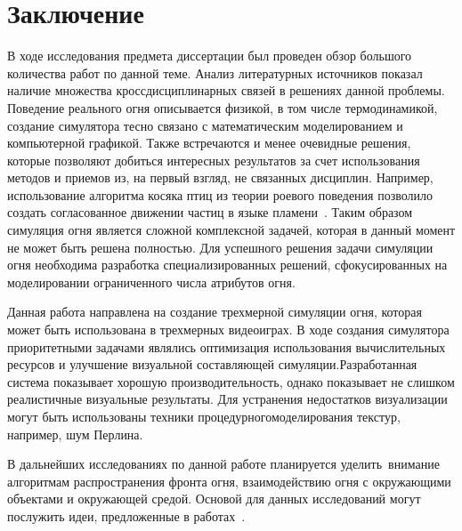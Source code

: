 \part*{Заключение}

В ходе исследования предмета диссертации был проведен обзор большого количества
работ по данной теме. Анализ литературных источников показал наличие множества
кроссдисциплинарных связей в решениях данной проблемы. Поведение реального огня
описывается физикой, в том числе термодинамикой, создание симулятора тесно
связано с математическим моделированием и компьютерной графикой. Также
встречаются и менее очевидные решения, которые позволяют добиться интересных
результатов за счет использования методов и приемов из, на первый взгляд, не
связанных дисциплин. Например, использование алгоритма косяка птиц из теории роевого
поведения позволило создать согласованное движении частиц в языке
пламени~\cite{Somasekaran2005UsingPS}. Таким образом симуляция огня является
сложной комплексной задачей, которая в данный момент не может быть решена
полностью. Для успешного решения задачи симуляции огня необходима разработка
специализированных решений, сфокусированных на моделировании ограниченного числа
атрибутов огня.

Данная работа направлена на создание трехмерной симуляции огня, которая может
быть использована в трехмерных видеоиграх. В ходе создания симулятора
приоритетными задачами являлись оптимизация использования вычислительных
ресурсов и улучшение визуальной составляющей симуляции.\break{}Разработанная система
показывает хорошую производительность, однако показывает не слишком реалистичные
визуальные результаты. Для устранения недостатков визуализации могут быть
использованы техники процедурного\break{}моделирования текстур, например, шум Перлина.

В дальнейших исследованиях по данной работе планируется уделить~\break{}внимание
алгоритмам распространения фронта огня, взаимодействию огня с окружающими
объектами и окружающей средой. Основой для данных исследований могут послужить
идеи, предложенные в работах~\cite{MeshesOnFire,Zhao2003VoxelsOF,Perry94synthesizingflames}.
